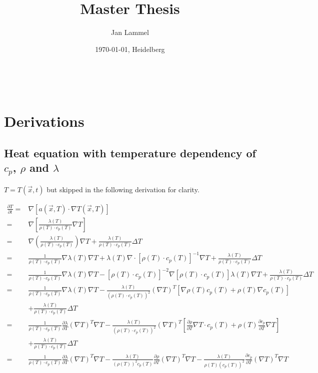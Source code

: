 \documentclass{scrartcl}[12pt, halfparskip]
\title{Master Thesis}
\author{Jan Lammel}
\date{\today{}, Heidelberg}
\begin{document}
\maketitle \ \\ 
\newpage

\section{Derivations}
\subsection{Heat equation with temperature dependency of $c_p$, $\rho$ and $\lambda$}


$T = T(\vec{x},t)$ but skipped in the following derivation for clarity.

\begin{align*}
	\frac{\partial T}{\partial t} = & \nabla \left[ a(\vec{x},T) \cdot \nabla T(\vec{x},T) \right] \\
	= & \nabla \left[ \frac{\lambda(T)}{\rho(T) \cdot c_p(T)} \nabla T \right] \\
	= & \nabla \left( \frac{\lambda(T)}{\rho(T) \cdot c_p(T)} \right) \nabla T + \frac{\lambda(T)}{\rho(T) \cdot c_p(T)} \Delta T \\
	= & \frac{1}{\rho (T) \cdot c_p (T)} \nabla \lambda (T) \nabla T + \lambda (T) \nabla \cdot \left[ \rho (T) \cdot c_p (T) \right]^{-1} \nabla T + \frac{\lambda (T)}{\rho (T) \cdot c_p (T)} \Delta T \\
	= & \frac{1}{\rho (T) \cdot c_p (T)} \nabla \lambda (T) \nabla T - \left[ \rho (T) \cdot c_p (T) \right]^{-2} \nabla \left[ \rho (T) \cdot c_p (T) \right] \lambda(T) \nabla T + \frac{\lambda (T)}{\rho (T) \cdot c_p (T)} \Delta T \\
	= & \frac{1}{\rho (T) \cdot c_p (T)} \nabla \lambda (T) \nabla T - \frac{\lambda (T)}{(\rho(T) \cdot c_p(T))^2} (\nabla T)^T \left[ \nabla \rho(T) c_p(T) + \rho(T) \nabla c_p(T) \right] \\
	& + \frac{\lambda (T)}{\rho (T) \cdot c_p (T)} \Delta T \\
	= & \frac{1}{\rho (T) \cdot c_p (T)} \frac{\partial \lambda}{\partial T} (\nabla T)^T \nabla T - \frac{\lambda (T)}{(\rho(T) \cdot c_p(T))^2} (\nabla T)^T \left[ \frac{\partial \rho}{\partial T} \nabla T \cdot c_p(T) + \rho(T) \frac{ \partial c_p}{\partial T} \nabla T \right] \\
	& + \frac{\lambda (T)}{\rho (T) \cdot c_p (T)} \Delta T \\
	= & \frac{1}{\rho (T) \cdot c_p (T)} \frac{\partial \lambda}{\partial T} (\nabla T)^T \nabla T - \frac{\lambda (T)}{(\rho(T))^2 c_p(T)} \frac{\partial \rho}{\partial T} (\nabla T)^T \nabla T - \frac{\lambda (T)}{\rho(T) (c_p(T))^2} \frac{\partial c_p}{\partial T} (\nabla T)^T \nabla T \\

\end{align*}
\end{document}
